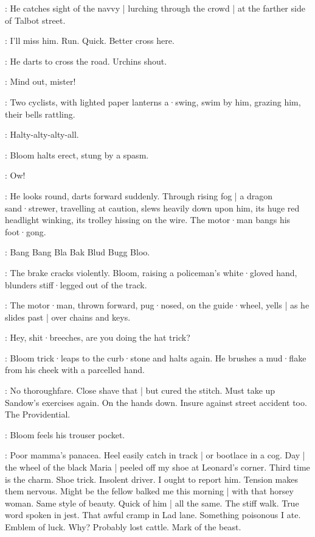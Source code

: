 :
He catches sight of the navvy |
lurching through the crowd |
at the farther side of Talbot street.

\Bloom:
I'll miss him.
Run.
Quick.
Better cross here.

:
He darts to cross the road.
Urchins shout.

\Urchins:
Mind out,
mister!

:
Two cyclists,
with lighted paper lanterns a·swing,
swim by him,
grazing him,
their bells rattling.

\Bells:
Halty-alty-alty-all.

:
Bloom halts erect,
stung by a spasm.

\Bloom:
Ow!

:
He looks round,
darts forward suddenly.
Through rising fog |
a dragon sand·strewer,
travelling at caution,
slews heavily down upon him,
its huge red headlight winking,
its trolley hissing on the wire.
The motor·man bangs his foot·gong.

\Gong:
Bang Bang Bla Bak Blud Bugg Bloo.

:
The brake cracks violently.
Bloom,
raising a policeman's white·gloved hand,
blunders stiff·legged out of the track.

:
The motor·man,
thrown forward,
pug·nosed,
on the guide·wheel,
yells |
as he slides past |
over chains and keys.

\Motorman:
Hey,
shit·breeches,
are you doing the hat trick?

:
Bloom trick·leaps to the curb·stone and halts again.
He brushes a mud·flake from his cheek with a parcelled hand.

\Bloom:
No thoroughfare.
Close shave that |
but cured the stitch.
Must take up Sandow's exercises again.
On the hands down.
Insure against street accident too.
The Providential.

:
Bloom feels his trouser pocket.

\Bloom:
Poor mamma's panacea.
Heel easily catch in track |
or bootlace in a cog.
Day |
the wheel of the black Maria |
peeled off my shoe at Leonard's corner.
Third time is the charm.
Shoe trick.
Insolent driver.
I ought to report him.
Tension makes them nervous.
Might be the fellow balked me this morning |
with that horsey woman.
Same style of beauty.
Quick of him |
all the same.
The stiff walk.
True word spoken in jest.
That awful cramp in Lad lane.
Something poisonous I ate.
Emblem of luck.
Why?
Probably lost cattle.
Mark of the beast.

